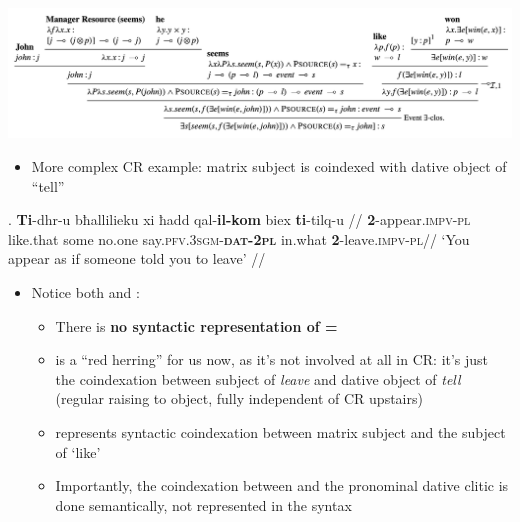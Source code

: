 \documentclass[11pt]{article}
\begin{document}
\includegraphics[scale=0.25]{SCR-20240317-bvtm.png}


\begin{itemize}
  \item More complex CR example: matrix subject is coindexed with dative object of ``tell''
\end{itemize}

\ex. \begingl
\gla \textbf{Ti}-dhr-u bħallilieku xi ħadd qal-\textbf{il-kom} biex \textbf{ti}-tilq-u //
\glb \textbf{2}-appear.\textsc{impv-pl} like.that some no.one say.\textsc{pfv.3sgm-\textbf{dat-2pl}} in.what \textbf{2}-leave.\textsc{impv-pl}//
\glft `You appear as if someone told you to leave' //
\endgl

\begin{itemize}
  \item Notice both \avm{\1} and \avm{\2}: \begin{itemize}
      \item There is \textbf{no syntactic representation of \avm{\1} = \avm{\2}}
      \item \avm{\2} is a ``red herring'' for us now, as it's not involved at all in CR: it's just the coindexation between subject of \textit{leave} and dative object of \textit{tell} (regular raising to object, fully independent of CR upstairs)
      \item \avm{\1} represents  syntactic coindexation between matrix subject and the subject of `like'
      \item Importantly, the coindexation between \avm{\1} and the pronominal dative clitic is done semantically, not represented in the syntax
    \end{itemize}
\end{itemize}
\end{document}

